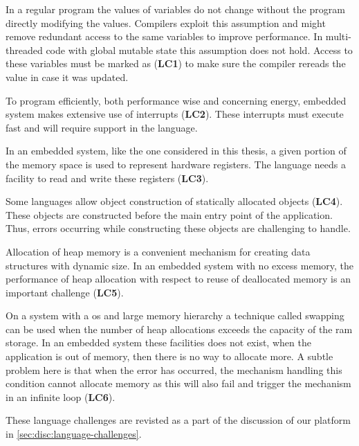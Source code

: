 In a regular program the values of variables do not change without the program directly modifying the values.
Compilers exploit this assumption and might remove redundant access to the same variables to improve performance.
In multi-threaded code with global mutable state this assumption does not hold.
Access to these variables must be marked as  (\textbf{LC1}) to make sure the compiler rereads the value in case it was updated.

To program efficiently, both performance wise and concerning energy, embedded system makes extensive use of interrupts (\textbf{LC2}).
These interrupts must execute fast and will require support in the language.

In an embedded system, like the one considered in this thesis, a given portion of the memory space is used to represent hardware registers.
The language needs a facility to read and write these registers (\textbf{LC3}).

Some languages allow object construction of statically allocated objects (\textbf{LC4}).
These objects are constructed before the main entry point of the application.
Thus, errors occurring while constructing these objects are challenging to handle.

Allocation of heap memory is a convenient mechanism for creating data structures with dynamic size.
In an embedded system with no excess memory, the performance of heap allocation with respect to reuse of deallocated memory is an important challenge (\textbf{LC5}).

On a system with a \gls{os} and large memory hierarchy a technique called swapping can be used when the number of heap allocations exceeds the capacity of the \gls{ram} storage.
In an embedded system these facilities does not exist, when the application is out of memory, then there is no way to allocate more.
A subtle problem here is that when the error has occurred, the mechanism handling this condition cannot allocate memory as this will also fail and trigger the mechanism in an infinite loop (\textbf{LC6}).

These language challenges are revisted as a part of the discussion of our platform in \autoref{sec:disc:language-challenges}.

